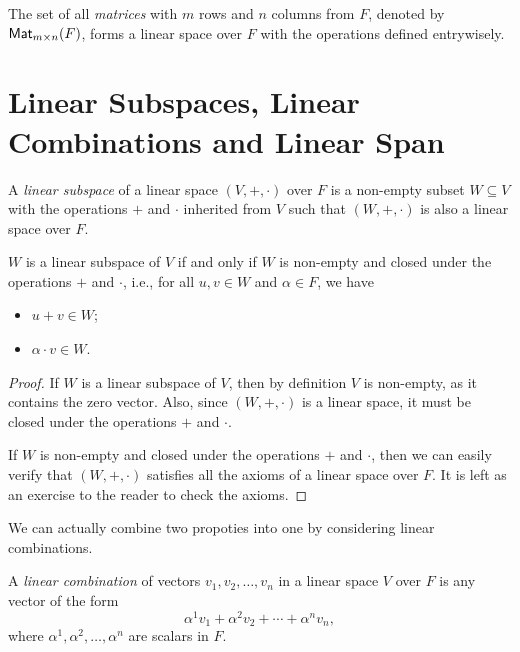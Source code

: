 \begin{example}
  The set of all \emph{matrices} with $m$ rows and $n$ columns from $F$, denoted by $\operatorname{\text{\normalfont\sffamily Mat}}_{m \times n}(F)$, forms a linear space over $F$ with the operations defined entrywisely.
\end{example}

\section{Linear Subspaces, Linear Combinations and Linear Span}

\begin{definition}\label{def:linear_subspace}
  A \emph{linear subspace} of a linear space $(V, +, \cdot)$ over $F$ is a non-empty subset $W \subseteq V$ with the operations $+$ and $\cdot$ inherited from $V$ such that $(W, +, \cdot)$ is also a linear space over $F$.
\end{definition}

\begin{proposition}
  $W$ is a linear subspace of $V$ if and only if $W$ is non-empty and closed under the operations $+$ and $\cdot$, i.e., for all $u, v \in W$ and $\alpha \in F$, we have
  \begin{itemize}
    \item $u + v \in W$;
    \item $\alpha \cdot v \in W$.
  \end{itemize}
\end{proposition}
\begin{proof}
  If $W$ is a linear subspace of $V$, then by definition $V$ is non-empty, as it contains the zero vector. Also, since $(W, +, \cdot)$ is a linear space, it must be closed under the operations $+$ and $\cdot$.

  If $W$ is non-empty and closed under the operations $+$ and $\cdot$, then we can easily verify that $(W, +, \cdot)$ satisfies all the axioms of a linear space over $F$. It is left as an exercise to the reader to check the axioms.
\end{proof}

We can actually combine two propoties into one by considering linear combinations.

\begin{definition}\label{def:linear_combination}
  A \emph{linear combination} of vectors $v_1, v_2, \ldots, v_n$ in a linear space $V$ over $F$ is any vector of the form
  \[
    \alpha^1 v_1 + \alpha^2 v_2 + \cdots + \alpha^n v_n,
  \]
  where $\alpha^1, \alpha^2, \ldots, \alpha^n$ are scalars in $F$.
\end{definition}

